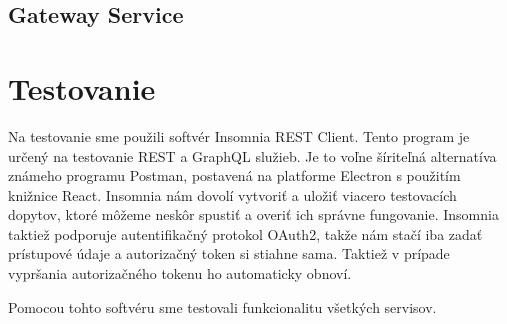 \subsection{Gateway Service}  


\section{Testovanie}  
Na testovanie sme použili softvér Insomnia REST Client\cite{insomnia}. Tento program je určený na testovanie REST a GraphQL služieb. Je to voľne šíriteľná alternatíva známeho programu Postman, postavená na platforme Electron s použitím knižnice React. Insomnia nám dovolí vytvoriť a uložiť viacero testovacích dopytov, ktoré môžeme neskôr spustiť a overiť ich správne fungovanie. Insomnia taktiež podporuje autentifikačný protokol OAuth2, takže nám stačí iba zadať prístupové údaje a autorizačný token si stiahne sama. Taktiež v prípade vypršania autorizačného tokenu ho automaticky obnoví.  

Pomocou tohto softvéru sme testovali funkcionalitu všetkých servisov. 




